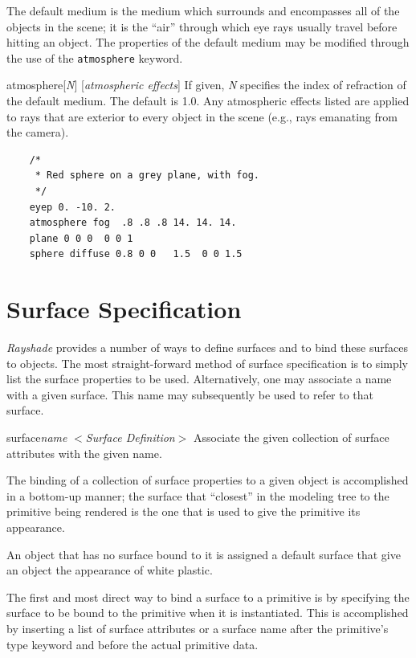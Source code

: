 The default medium is the medium which surrounds and encompasses
all of the objects in the scene; it is the ``air'' through which eye
rays usually travel before hitting an object.  The properties of
the default medium may be modified through the use of the {\tt atmosphere}
keyword.

\begin{defkey}{atmosphere}{[{\em N\/}] [{\em atmospheric effects}]}
If given, {\em N} specifies the index of refraction of the default
medium.  The default is 1.0.  Any atmospheric effects listed are applied
to rays that are exterior to every object in the scene (e.g., rays
emanating from the camera).
\end{defkey}

\begin{verbatim}
    /*
     * Red sphere on a grey plane, with fog.
     */
    eyep 0. -10. 2.
    atmosphere fog  .8 .8 .8 14. 14. 14.
    plane 0 0 0  0 0 1
    sphere diffuse 0.8 0 0   1.5  0 0 1.5
\end{verbatim}

\section {Surface Specification}

{\em Rayshade} provides a number of ways to define surfaces and to
bind these surfaces to objects.  The most straight-forward method
of surface specification is to simply list the surface properties to
be used.
Alternatively, one may associate a name with a given surface.
This name may subsequently be used to refer to that surface.

\begin{defkey}{surface}{{\em name\/} $<${\em Surface Definition}$>$}
	Associate the given collection of surface attributes with the
	given name.
\end{defkey}

The binding of a collection of surface properties to a given object
is accomplished in a bottom-up manner; the surface that ``closest''
in the modeling tree to the primitive being rendered is the one that
is used to give the primitive its appearance.

An object that has no surface bound to it is assigned a default surface
that give an object the appearance of white plastic.

The first
and most direct way to bind a surface to a primitive
is by specifying the surface to be bound to
the primitive when it is instantiated.
This is accomplished
by inserting a list of surface attributes or a surface name after
the primitive's type keyword and before the actual primitive data.

